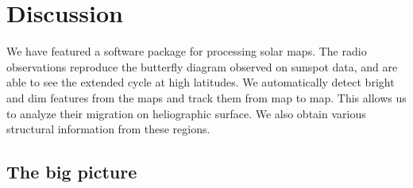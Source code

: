 \documentclass{aa}
\begin{document}
%
%
%

\section{Discussion}

We have featured a software package for processing solar maps. The radio observations reproduce the butterfly diagram 
observed on sunspot data, and are able to see the extended cycle at high latitudes. We automatically detect bright and 
dim features from the maps and track them from map to map. This allows us to analyze their migration on heliographic 
surface. We also obtain various structural information from these regions.

\subsection{The big picture}
\end{document}
